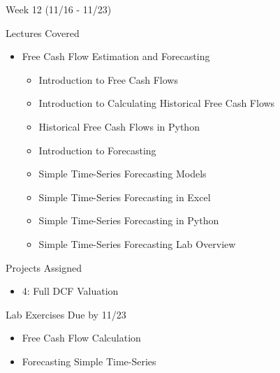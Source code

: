 \documentclass[]{article}
\begin{document}
\begin{section}{Week 12 (11/16 - 11/23)}
\begin{subsection}{Lectures Covered}
\begin{itemize}
\item Free Cash Flow Estimation and Forecasting
\begin{itemize}
\item Introduction to Free Cash Flows
\item Introduction to Calculating Historical Free Cash Flows
\item Historical Free Cash Flows in Python
\item Introduction to Forecasting
\item Simple Time-Series Forecasting Models
\item Simple Time-Series Forecasting in Excel
\item Simple Time-Series Forecasting in Python
\item Simple Time-Series Forecasting Lab Overview
\end{itemize}
\end{itemize}
\end{subsection}
\begin{subsection}{Projects Assigned}
\begin{itemize}
\item 4: Full DCF Valuation
\end{itemize}
\end{subsection}
\begin{subsection}{Lab Exercises Due by 11/23}
\begin{itemize}
\item Free Cash Flow Calculation
\item Forecasting Simple Time-Series
\end{itemize}
\end{subsection}
\end{section}
\end{document}
